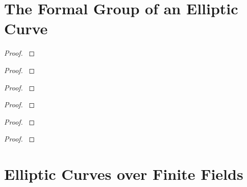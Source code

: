 \documentclass[12pt,reqno]{amsart}
\begin{document}
\newpage
\section{The Formal Group of an Elliptic Curve}\label{4}
\begin{exe}\label{4.1}

\begin{proof}\label{s4.1}

\end{proof} 
\end{exe} 

\begin{exe}\label{4.2}

\begin{proof}\label{s4.2}

\end{proof} 
\end{exe} 

\begin{exe}\label{4.3}

\begin{proof}\label{s4.3}

\end{proof} 
\end{exe} 

\begin{exe}\label{4.4}	

\begin{proof}\label{s4.4}

\end{proof} 
\end{exe} 

\begin{exe}\label{4.5}

\begin{proof}\label{s4.5}

\end{proof} 
\end{exe} 

\begin{exe}\label{4.6}

\begin{proof}\label{s4.6}

\end{proof} 
\end{exe} 

\newpage
\section{Elliptic Curves over Finite Fields}\label{5}
\end{document}
